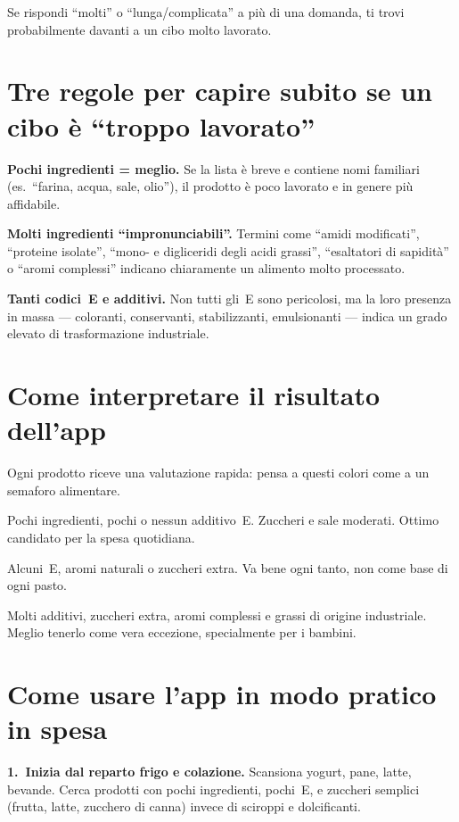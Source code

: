 \documentclass[a5paper,12pt,oneside,openany]{book}
\newcommand{\boxverde}[2]{%
  \begin{tcolorbox}[boxbase,
    colback=verdescuro!8!white, colframe=verdescuro, title={#1}]
  #2\end{tcolorbox}}
\newcommand{\boxgiallo}[2]{%
  \begin{tcolorbox}[boxbase,
    colback=giallo!12!white, colframe=giallo!80!black, title={#1}]
  #2\end{tcolorbox}}
\newcommand{\boxrosso}[2]{%
  \begin{tcolorbox}[boxbase,
    colback=rosso!8!white, colframe=rosso, title={#1}]
  #2\end{tcolorbox}}
\begin{document}
Se rispondi ``molti'' o ``lunga/complicata'' a più di una domanda, ti
trovi probabilmente davanti a un cibo molto lavorato.

\section{Tre regole per capire subito se un cibo è ``troppo lavorato''}

\textbf{Pochi ingredienti = meglio.} Se la lista è breve e contiene nomi
familiari (es.\ ``farina, acqua, sale, olio''), il prodotto è poco lavorato
e in genere più affidabile.

\textbf{Molti ingredienti ``impronunciabili''.} Termini come ``amidi modificati'',
``proteine isolate'', ``mono- e digliceridi degli acidi grassi'',
``esaltatori di sapidità'' o ``aromi complessi'' indicano chiaramente un
alimento molto processato.

\textbf{Tanti codici~E e additivi.} Non tutti gli~E sono pericolosi, ma
la loro presenza in massa --- coloranti, conservanti, stabilizzanti,
emulsionanti --- indica un grado elevato di trasformazione industriale.

\section{Come interpretare il risultato dell'app}

Ogni prodotto riceve una valutazione rapida: pensa a questi colori come
a un semaforo alimentare.

\boxverde{Poco lavorato --- via libera}{Pochi ingredienti, pochi o nessun
additivo~E. Zuccheri e sale moderati. Ottimo candidato per la spesa
quotidiana.}

\boxgiallo{Moderatamente lavorato --- con moderazione}{Alcuni~E, aromi
naturali o zuccheri extra. Va bene ogni tanto, non come base di ogni
pasto.}

\boxrosso{Ultra-processato --- limita o evita}{Molti additivi, zuccheri
extra, aromi complessi e grassi di origine industriale. Meglio tenerlo come
vera eccezione, specialmente per i bambini.}

\section{Come usare l'app in modo pratico in spesa}

\textbf{1.~Inizia dal reparto frigo e colazione.} Scansiona yogurt, pane,
latte, bevande. Cerca prodotti con pochi ingredienti, pochi~E, e zuccheri
semplici (frutta, latte, zucchero di canna) invece di sciroppi e
dolcificanti.
\end{document}
